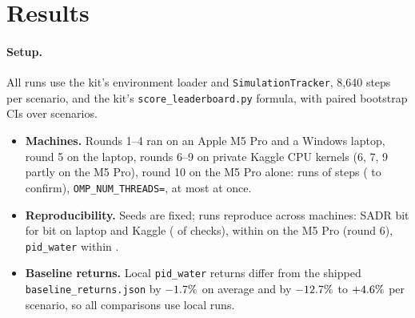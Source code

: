 \documentclass{article}
\begin{document}
\section{Results}
\label{sec:results}

\paragraph{Setup.} All runs use the kit's environment loader and \texttt{SimulationTracker}, 8,640 steps per scenario, and the kit's \texttt{score\_leaderboard.py} formula, with paired bootstrap CIs over scenarios.
\begin{itemize}
\item \textbf{Machines.} Rounds 1--4 ran on an Apple M5 Pro and a Windows laptop, round 5 on the laptop, rounds 6--9 on private Kaggle CPU kernels (6, 7, 9 partly on the M5 Pro), round 10 on the M5 Pro alone: \RTenMacRuns{} runs of \RTenSteps{} steps (\RTenMacConfRuns{} to confirm), \texttt{OMP\_NUM\_THREADS=\RTenOmpThreads}, at most \RTenMacWorkersMax{} at once.
\item \textbf{Reproducibility.} Seeds are fixed; runs reproduce across machines: SADR bit for bit on laptop and Kaggle (\RSixReproIdentical{} of \RSixReproN{} checks), within \RSixMacReproMaxRel{} on the M5 Pro (round 6), \texttt{pid\_water} within \MachineGapPidWater.
\item \textbf{Baseline returns.} Local \texttt{pid\_water} returns differ from the shipped \texttt{baseline\_returns.json} by $-1.7\%$ on average and by $-12.7\%$ to $+4.6\%$ per scenario, so all comparisons use local runs.
\end{itemize}


\end{document}

